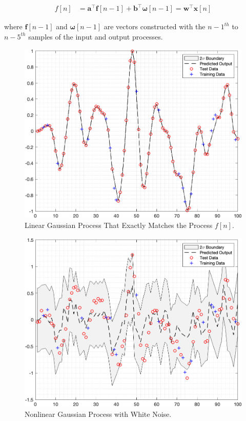 \documentclass[journal]{IEEEtran}
\begin{document}
\paragraph{}

\begin{align*}
    f[n] &= \mathbf{a}^\top \mathbf{f}[n-1] + \mathbf{b}^\top \bm{\omega}[n-1] = \mathbf{w}^\top \mathbf{x}[n]
\end{align*}

\noindent where \(\mathbf{f}[n-1]\) and \(\bm{\omega}[n-1]\) are vectors constructed with the \({n-1}^{th}\) to \({n-5}^{th}\) samples of the input and output processes.

\begin{figure}[ht!]
    \centering
    \includegraphics[width=\linewidth]{figure05.png}
    \caption{Linear Gaussian Process That Exactly Matches the Process \(f[n]\).}
    \label{fig:fig05}
\end{figure}

\begin{figure}[ht!]
    \centering
    \includegraphics[width=\linewidth]{figure04.png}
    \caption{Nonlinear Gaussian Process with White Noise.}
    \label{fig:fig04}
\end{figure}
\end{document}
